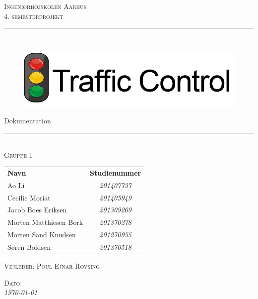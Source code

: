 \newcommand{\HRule}{\rule{\linewidth}{0.1mm}} %
\thispagestyle{empty}
\begin{center}
	\vspace{3cm}
	\textsc{\LARGE Ingeniørhøjskolen Aarhus}\\[1.5cm] %
	
	\textsc{\large 4. semesterprojekt}\\[2.5cm] 
	
	\HRule \\[0.8cm]
		\begin{figure}[h!]
		\centering
		\includegraphics[width=0.7\linewidth]{Forside/Logo}
	\end{figure}
	{\LARGE Dokumentation} \\[0.4cm]
	\HRule \\[1.5cm]
	
	\textsc{\large Gruppe 1}\\
	\vspace{0.5 in}
	\begin{center}
		\begin{tabular}{l c}
			\textbf{Navn} & \textbf{Studienummer} \\
			Ao Li & \textsl{201407737}    \\
			Cecilie Moriat & \textsl{201405949}  \\
			Jacob Boes Eriksen & \textsl{201309269} \\
			Morten Matthiesen Bork & \textsl{201370278}  \\
			Morten Sand Knudsen & \textsl{201270955}  \\
			Søren Boldsen & \textsl{201370518}  \\
			
		\end{tabular}
	\end{center}
	\vspace{0.5 in}
	
	\textsc{\large Vejleder: Poul Ejnar Rovsing}
	\vspace{0.5 in}
	
	\textsc{\large Dato: }\\
	{\large\textit{\today}} \\[3cm]
	\vfill %
	
\end{center} %

\clearpage

\newpage